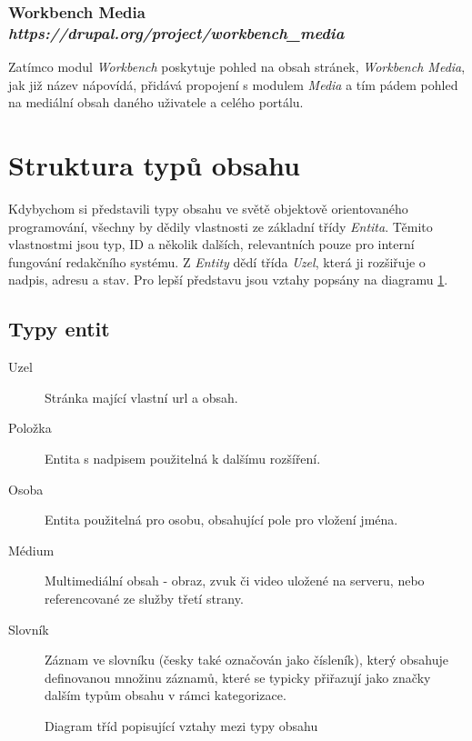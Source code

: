 \subsubsection*{\textbf{Workbench Media} \hfill \emph{https://drupal.org/project/workbench\_media}}
Zatímco modul \emph{Workbench} poskytuje pohled na obsah stránek, \emph{Workbench Media}, jak již název nápovídá, přidává propojení s modulem \emph{Media} a tím pádem pohled na mediální obsah daného uživatele a celého portálu. 

\section{Struktura typů obsahu}
\label{subsec:typy-obsahu}

Kdybychom si představili typy obsahu ve světě objektově orientovaného programování, všechny by dědily vlastnosti ze základní třídy \emph{Entita}. Těmito vlastnostmi jsou typ, ID a několik dalších, relevantních pouze pro interní fungování redakčního systému. Z \emph{Entity} dědí třída \emph{Uzel}, která ji rozšiřuje o nadpis, adresu a stav. Pro lepší představu jsou vztahy popsány na diagramu \ref{fig:class-diagram}. 

\subsection*{Typy entit}

\begin{description}
  \item[Uzel] Stránka mající vlastní \gls{url} a obsah.
  \item[Položka] Entita s nadpisem použitelná k dalšímu rozšíření.
  \item[Osoba] Entita použitelná pro osobu, obsahující pole pro vložení jména.
  \item[Médium] Multimediální obsah - obraz, zvuk či video uložené na serveru, nebo referencované ze služby třetí strany.
  \item[Slovník] Záznam ve slovníku (česky také označován jako čísleník), který obsahuje definovanou množinu záznamů, které se typicky přiřazují jako značky dalším typům obsahu v rámci kategorizace.
\end{description}

\begin{figure}[htp] 
\caption{Diagram tříd popisující vztahy mezi typy obsahu}
\label{fig:class-diagram}
\end{figure}  

